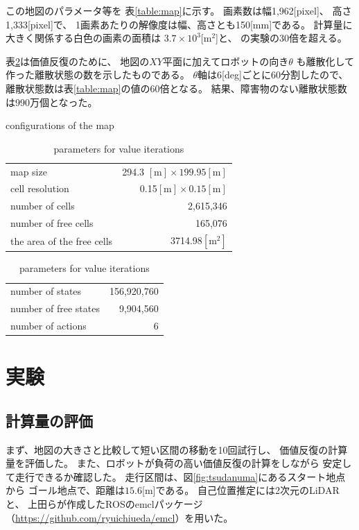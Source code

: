 \documentclass{jarticle}
\begin{document}
この地図のパラメータ等を
表\ref{table:map}に示す。
画素数は幅1,962[pixel]、
高さ1,333[pixel]で、
1画素あたりの解像度は幅、高さとも150[mm]である。
計算量に大きく関係する白色の画素の面積は
$3.7\times 10^3$[m$^2$]と、\cite{上田rsj2021}
の実験の30倍を超える。

表\ref{table:cells}は価値反復のために、
地図の$XY$平面に加えてロボットの向き$\theta$
も離散化して作った離散状態の数を示したものである。
$\theta$軸は6[deg]ごとに60分割したので、
離散状態数は表\ref{table:map}の値の60倍となる。
結果、障害物のない離散状態数は990万個となった。

\begin{table}[bt]
  \caption{conﬁgurations of the map}
	\label{table:map}
  \centering
	\begin{small}
  \begin{tabular}{l|r}
    \hline
    map size & 294.3 $\mathrm{[m]}\times 199.95\mathrm{[m]}$\\
    cell resolution &  0.15$\mathrm{[m]}\times 0.15\mathrm{[m]}$ \\
		number of cells & 2,615,346\\
    number of free cells & 165,076\\
		the area of the free cells & 3714.98$\mathrm{[m^2]}$\\
    \hline
  \end{tabular}
	\end{small}
	\caption{parameters for value iterations}
	\label{table:cells}
  \centering
	\begin{small}
  \begin{tabular}{l|r}
    \hline
    number of states & 156,920,760\\
    number of free states &  9,904,560\\
		number of actions & 6\\
    \hline
  \end{tabular}
	\end{small}
\end{table}

\section{実験}%

\subsection{計算量の評価}

まず、地図の大きさと比較して短い区間の移動を10回試行し、
価値反復の計算量を評価した。
また、ロボットが負荷の高い価値反復の計算をしながら
安定して走行できるか確認した。
走行区間は、図\ref{fig:tsudanuma}にあるスタート地点から
ゴール地点で、距離は$15.6$[m]である。
自己位置推定には2次元のLiDARと、
上田らが作成したROSのemclパッケージ
（\url{https://github.com/ryuichiueda/emcl}）を用いた。
\end{document}
